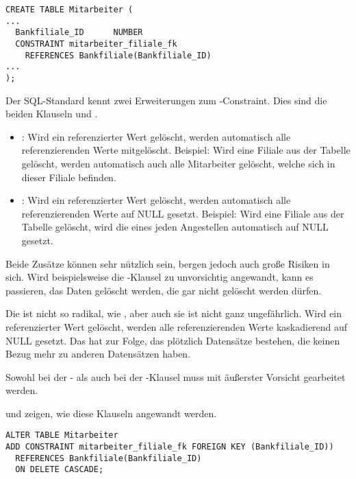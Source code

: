 \begin{lstlisting}[language=oracle_sql,caption={Ein Foreign Key-Constraint als Inline Constraint anlegen},label=sql09_16]
CREATE TABLE Mitarbeiter (
...
  Bankfiliale_ID      NUMBER
  CONSTRAINT mitarbeiter_filiale_fk
    REFERENCES Bankfiliale(Bankfiliale_ID)
...
);
        \end{lstlisting}
Der SQL-Standard kennt zwei Erweiterungen zum -Constraint. Dies sind die beiden Klauseln  und .
\begin{itemize}
    \item {}: Wird ein referenzierter Wert gelöscht, werden automatisch alle referenzierenden Werte mitgelöscht. Beispiel: Wird eine Filiale aus der Tabelle  gelöscht, werden automatisch auch alle Mitarbeiter gelöscht, welche sich in dieser Filiale befinden.
    \item {}: Wird ein referenzierter Wert gelöscht, werden automatisch alle referenzierenden Werte auf NULL gesetzt. Beispiel: Wird eine Filiale aus der Tabelle  gelöscht, wird die  eines jeden Angestellen automatisch auf NULL gesetzt.
\end{itemize}
Beide Zusätze können sehr nützlich sein, bergen jedoch auch große Risiken in sich. Wird beispielsweise die -Klausel zu unvorsichtig angewandt, kann es passieren, das Daten gelöscht werden, die gar nicht gelöscht werden dürfen.

Die  ist nicht so radikal, wie , aber auch sie ist nicht ganz ungefährlich. Wird ein referenzierter Wert gelöscht, werden alle referenzierenden Werte kaskadierend auf NULL gesetzt. Das hat zur Folge, das plötzlich Datensätze bestehen, die keinen Bezug mehr zu anderen Datensätzen haben.

\begin{merke}
    Sowohl bei der - als auch bei der -Klausel muss mit äußerster Vorsicht gearbeitet werden.
\end{merke}
 und  zeigen, wie diese Klauseln angewandt werden.
\begin{lstlisting}[language=oracle_sql,caption={Ein Foreign Key-Constraint mit ON DELETE CASCADE-Klausel},label=sql09_17]
ALTER TABLE Mitarbeiter
ADD CONSTRAINT mitarbeiter_filiale_fk FOREIGN KEY (Bankfiliale_ID))
  REFERENCES Bankfiliale(Bankfiliale_ID)
  ON DELETE CASCADE;
        \end{lstlisting}

